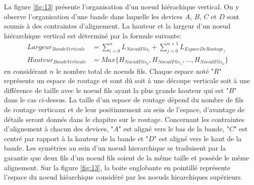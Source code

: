 La figure \ref{fig:13} présente l'organisation d'un noeud hiérachique vertical. On y observe l'organisation d'une bande dans laquelle les devices $A$, $B$, $C$ et $D$ sont soumis à des contraintes d'alignement. La hauteur et la largeur d'un noeud hiérarchique vertical est déterminé par la formule suivante:
\begin{equation}
\begin{aligned}
Largeur_{BandeVerticale} &= \sum_{i=0}^{n} L_{NoeudFils_i} + \sum_{j=0}^{n+1} L_{EspaceDeRoutage_j} \\
Hauteur_{BandeVerticale} &= Max\{H_{NoeudFils_0},H_{NoeudFils_1}, ... , H_{NoeudFils_n}\}
\end{aligned}
\end{equation}
en considérant $n$ le nombre total de noeuds fils. Chaque espace noté "$R$" représente un espace de routage et sont dû soit à une découpe verticale soit à une différence de taille avec le noeud fils ayant la plus grande hauteur qui est "$B$" dans le cas ci-dessus. La taille d'un espace de routage dépend du nombre de fils de routage verticaux et de leur positinnement au sein de l'espace, d'avantage de détails seront donnés dans le chapitre sur le routage. Concernant les contraintes d'alignement à chacun des devices, "$A$" est aligné vers le bas de la bande, "$C$" est centré par rapport à la hauteur de la bande et "$D$" est aligné vers le haut de la bande. Les symétries au sein d'un noeud hierarchique se traduisent par la garantie que deux fils d'un noeud fils soient de la même taille et possède le même alignement. Sur la figure \ref{fig:13}, la boite englobante en pointillé représente l'espace du noeud hiéarchique considéré par les noeuds hiearchiques supérieurs.






